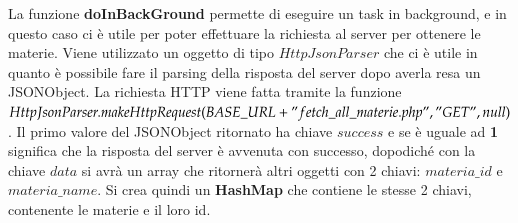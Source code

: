 \documentclass[a4paper, 50pt, twoside]{article}
\begin{document}
\newpage La funzione \textbf{doInBackGround} permette di eseguire un task in background, e in questo caso ci è utile per poter effettuare la richiesta al server per ottenere le materie. Viene utilizzato un oggetto di tipo $HttpJsonParser$ che ci è utile in quanto è possibile fare il parsing della risposta del server dopo averla resa un JSONObject. La richiesta HTTP viene fatta tramite la funzione \\$HttpJsonParser.makeHttpRequest(BASE\_URL + "fetch\_all\_materie.php", "GET", null)$.	
Il primo valore del JSONObject ritornato ha chiave $success$ e se è uguale ad \textbf{1} significa che la risposta del server è avvenuta con successo, dopodiché con la chiave $data$ si avrà un array che ritornerà altri oggetti con 2 chiavi: $materia\_id$ e  $materia\_name$.
Si crea quindi un \textbf{HashMap} che contiene le stesse 2 chiavi, contenente le materie e il loro id.
\end{document}
